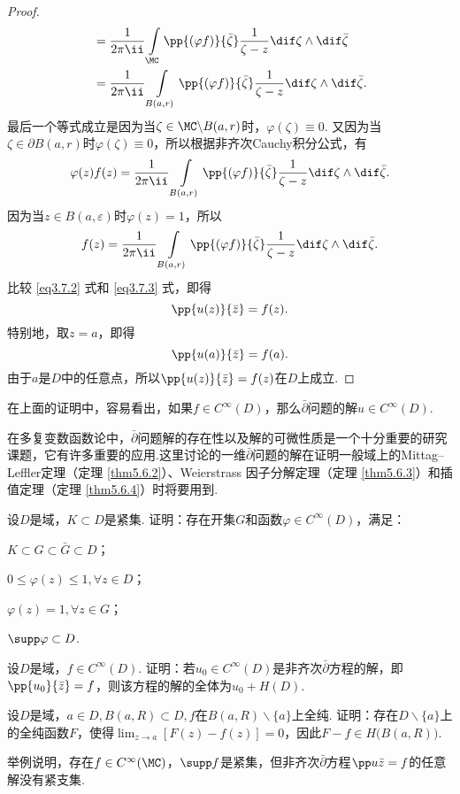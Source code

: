 \begin{proof}
\begin{equation}
\begin{aligned}
&=\frac1{2\pi\ii}\int\limits_\MC\pp{(\varphi f)}{\bar\zeta}\frac1{\zeta-z}\dif \zeta\wedge\dif \bar\zeta\\
&=\frac1{2\pi\ii}\int\limits_{B(a,r)}\pp{(\varphi f)}{\bar\zeta}\frac1{\zeta-z}
\dif \zeta\wedge\dif \bar\zeta.
\end{aligned}
\end{equation}
最后一个等式成立是因为当$\zeta\in\MC\backslash B(a,r)$时，$\varphi(\zeta)\equiv0$. 又因为当$\zeta\in\partial B(a,r)$时$\varphi(\zeta)\equiv0$，所以根据非齐次Cauchy积分公式，有
\[\varphi(z)f(z)=\frac1{2\pi\ii}\int\limits_{B(a,r)}\pp{(\varphi f)}{\bar\zeta}
\frac1{\zeta-z}\dif \zeta\wedge\dif \bar\zeta.\]
因为当$z\in B(a,\varepsilon)$时$\varphi(z)=1$，所以
\begin{equation}\label{eq3.7.3}
f(z)=\frac1{2\pi\ii}\int\limits_{B(a,r)}\pp{(\varphi f)}{\bar\zeta}
\frac1{\zeta-z}\dif \zeta\wedge\dif \bar\zeta.
\end{equation}
比较 \eqref{eq3.7.2} 式和 \eqref{eq3.7.3} 式，即得
\[\pp{u(z)}{\bar z}=f(z).\]
特别地，取$z=a$，即得
\[\pp{u(a)}{\bar z}=f(a).\]
由于$a$是$D$中的任意点，所以$\pp{u(z)}{\bar z}=f(z)$在$D$上成立.
\end{proof}

在上面的证明中，容易看出，如果$f\in C^\infty(D)$，那么$\bar\partial$问题的解$u\in C^\infty(D)$.

在多复变数函数论中，$\bar\partial$问题解的存在性以及解的可微性质是一个十分重要的研究课题，它有许多重要的应用.这里讨论的一维$\bar\partial$问题的解在证明一般域上的Mittag--Leffler定理（定理 \ref{thm5.6.2}）、Weierstrass 因子分解定理（定理 \ref{thm5.6.3}）和插值定理（定理
 \ref{thm5.6.4}）时将要用到.
\begin{xiti}
\item 设$D$是域，$K\subset D$是紧集. 证明：存在开集$G$和函数$\varphi\in C^\infty(D)$，满足：
\begin{enuma}
  \item $K\subset G\subset \bar G\subset D$；
  \item $0\le\varphi(z)\le1,\forall z\in D$；
  \item $\varphi(z)=1,\forall z\in G$；
  \item $\supp\varphi\subset D$.
\end{enuma}
\item 设$D$是域，$f\in C^\infty(D)$. 证明：若$u_0\in C^\infty(D)$是非齐次$\bar\partial$方程的解，即$\pp{u_0}{\bar z}=f$，则该方程的解的全体为$u_0+H(D)$.
\item 设$D$是域，$a\in D,B(a,R)\subset D,f$在$B(a,R)\backslash\{a\}$上全纯. 证明：存在$D\backslash\{a\}$上的全纯函数$F$，使得$\lim_{z\to a}[F(z)-f(z)]=0$，因此$F-f\in H\big(B(a,R)\big)$.
\item 举例说明，存在$f\in C^\infty(\MC)$，$\supp f$是紧集，但非齐次$\bar\partial$方程$\pp u{\bar z}=f$的任意解没有紧支集.
\end{xiti}
